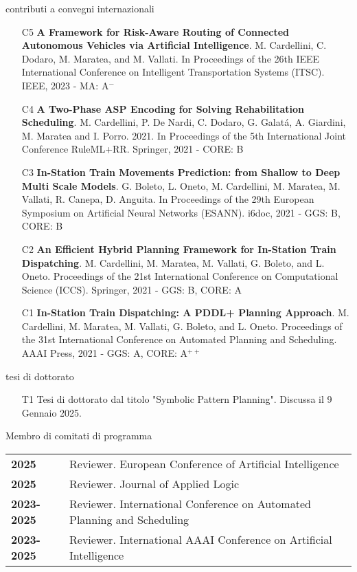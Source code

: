 \documentclass{resume} %
\begin{document}
\begin{rSection}{contributi a convegni internazionali}
\begin{enumerate}[leftmargin=5mm]
	\item[C5] \textbf{A Framework for Risk-Aware Routing of Connected Autonomous Vehicles via Artificial Intelligence}. M. Cardellini, C. Dodaro, M. Maratea, and M. Vallati. In Proceedings of the 26th IEEE International Conference on Intelligent Transportation Systems (ITSC). IEEE, 2023 - MA: A$^-$
	
	\item[C4] \textbf{A Two-Phase ASP Encoding for Solving Rehabilitation Scheduling}. M. Cardellini, P. De Nardi, C. Dodaro, G. Galat\'a, A. Giardini, M. Maratea and I. Porro. 2021. In Proceedings of the 5th International Joint Conference RuleML+RR. Springer, 2021 - CORE: B
	
	
	\item[C3] \textbf{In-Station Train Movements Prediction: from Shallow to Deep Multi Scale Models}. G. Boleto, L. Oneto, M. Cardellini, M. Maratea, M. Vallati, R. Canepa, D. Anguita. In Proceedings of the 29th European Symposium on Artificial Neural Networks (ESANN). i6doc, 2021 - GGS: B, CORE: B
	
	\item[C2] \textbf{An Efficient Hybrid Planning Framework for In-Station Train Dispatching}. M. Cardellini, M. Maratea, M. Vallati, G. Boleto, and L. Oneto. Proceedings of the 21st International Conference on Computational Science (ICCS). Springer, 2021 - GGS: B, CORE: A
	
	\item[C1] \textbf{In-Station Train Dispatching: A PDDL+ Planning Approach}. M. Cardellini, M. Maratea, M. Vallati, G. Boleto, and L. Oneto. Proceedings of the 31st International Conference on Automated Planning and Scheduling. AAAI Press, 2021 - GGS: A, CORE: A$^{++}$
\end{enumerate}
\end{rSection}

 \begin{rSection}{tesi di dottorato}
  \begin{enumerate}[leftmargin=5mm]
	\item[T1] Tesi di dottorato dal titolo "Symbolic Pattern Planning". Discussa il 9 Gennaio 2025.	
	\end{enumerate}
 \end{rSection}
 
 
  \begin{rSection}{Membro di comitati di programma}
	\begin{tabularx}{0.95\textwidth} {lp{14cm}}
 \textbf{2025} & Reviewer. European Conference of Artificial Intelligence \\
 \textbf{2025} & Reviewer. Journal of Applied Logic \\
 \textbf{2023-2025} & Reviewer. International Conference on Automated Planning and Scheduling \\
 \textbf{2023-2025} & Reviewer. International AAAI Conference on Artificial Intelligence 
  \end{tabularx}
 \end{rSection}
 
\end{document}
